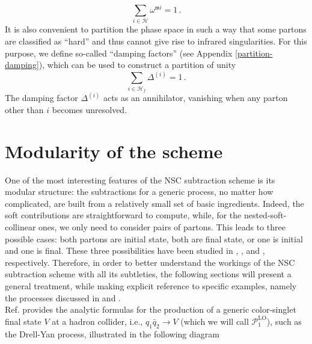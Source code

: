 \documentclass[a4paper, 12pt]{book}
\newcommand{\um}{\mathfrak{m}}
\begin{document}
\begin{equation}
    \sum_{i \in \mathcal{H}} \omega^{\um i} = 1 \,.
\end{equation}
It is also convenient to partition the phase space in such a way that some partons are classified as ``hard” and thus cannot give rise to infrared singularities. For this purpose, we define so-called ``damping factors” (see Appendix \ref{partition-damping}), which can be used to construct a partition of unity
\begin{equation}
  \sum_{i \in \mathcal{H}_f} \Delta^{(i)}=1 \, .
\end{equation}
The damping factor $\Delta^{(i)}$ acts as an annihilator, vanishing when any parton other than $i$ becomes unresolved.


\section{Modularity of the scheme}
\label{modularity-scheme}
One of the most interesting features of the NSC subtraction scheme is its modular structure: the subtractions for a generic process, no matter how complicated, are built from a relatively small set of basic ingredients. Indeed, the soft contributions are straightforward to compute, while, for the nested-soft-collinear ones, we only need to consider pairs of partons. This leads to three possible cases: both partons are initial state, both are final state, or one is initial and one is final. These three possibilities have been studied in \cite{Caola:1902}, \cite{Caola:1907}, and \cite{Asteriadis:1910}, respectively. Therefore, in order to better understand the workings of the NSC subtraction scheme with all its subtleties, the following sections will present a general treatment, while making explicit reference to specific examples, namely the processes discussed in \cite{Caola:1902} and \cite{Caola:1907}.
\\
Ref. \cite{Caola:1902} provides the analytic formulas for the production of a generic color-singlet final state $V$ at a hadron collider, i.e., $q_1\bar{q}_2 \to V$ (which we will call $\mathcal{P}_{1}^{\mathrm{LO}}$), such as the Drell-Yan process, illustrated in the following diagram
\end{document}
